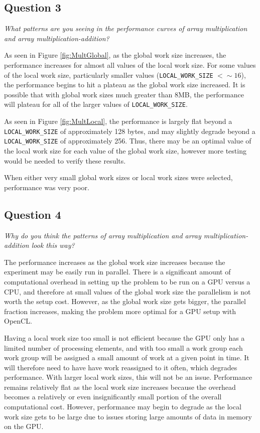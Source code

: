 \documentclass{article}
\begin{document}
\newpage

\subsection*{Question 3}
\textit{What patterns are you seeing in the performance curves of array multiplication and array multiplication-addition?}

As seen in Figure \ref{fig:MultGlobal}, as the global work size increases, the performance increases for almost all values of the local work size.  For some values of the local work size, particularly smaller values (\texttt{LOCAL\_WORK\_SIZE} $< \sim 16$), the performance begins to hit a plateau as the global work size increased.  It is possible that with global work sizes much greater than 8MB, the performance will plateau for all of the larger values of \texttt{LOCAL\_WORK\_SIZE}.

As seen in Figure \ref{fig:MultLocal}, the performance is largely flat beyond a \texttt{LOCAL\_WORK\_SIZE} of approximately 128 bytes, and may slightly degrade beyond a \texttt{LOCAL\_WORK\_SIZE} of approximately 256.  Thus, there may be an optimal value of the local work size for each value of the global work size, however more testing would be needed to verify these results.

When either very small global work sizes or local work sizes were selected, performance was very poor.

\subsection*{Question 4}
\textit{Why do you think the patterns of array multiplication and array multiplication-addition look this way?}

The performance increases as the global work size increases because the experiment may be easily run in parallel.  There is a significant amount of computational overhead in setting up the problem to be run on a GPU versus a CPU, and therefore at small values of the global work size the parallelism is not worth the setup cost.  However, as the global work size gets bigger, the parallel fraction increases, making the problem more optimal for a GPU setup with OpenCL.

Having a local work size too small is not efficient because the GPU only has a limited number of processing elements, and with too small a work group each work group will be assigned a small amount of work at a given point in time.  It will therefore need to have have work reassigned to it often, which degrades performance.  With larger local work sizes, this will not be an issue.  Performance remains relatively flat as the local work size increases because the overhead becomes a relatively or even insignificantly small portion of the overall computational cost.  However, performance may begin to degrade as the local work size gets to be large due to issues storing large amounts of data in memory on the GPU.
\end{document}
